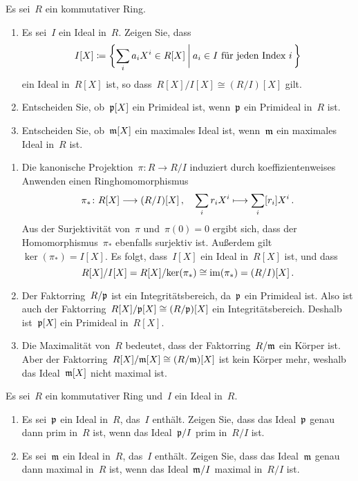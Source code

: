 \documentclass{scrartcl}
\begin{document}
\begin{exercise}
  Es sei~$R$ ein kommutativer Ring.
  \begin{enumerate}
    \item
      Es sei~$I$ ein Ideal in~$R$.
      Zeigen Sie, dass
      \[
        I[X]
        \defined
        \biggl\{
          \sum_i a_i X^i \in R[X]
        \suchthat[\bigg]
          \text{$a_i \in I$ für jeden Index~$i$}
          \spacing
        \biggr\}
      \]
      ein Ideal in~$R[X]$ ist, so dass~$R[X] / I[X] \cong (R/I)[X]$ gilt.
    \item
      Entscheiden Sie, ob~$\mathfrak{p}[X]$ ein Primideal ist, wenn~$\mathfrak{p}$ ein Primideal in~$R$ ist.
    \item
      Entscheiden Sie, ob~$\mathfrak{m}[X]$ ein maximales Ideal ist, wenn~$\mathfrak{m}$ ein maximales Ideal in~$R$ ist.
  \end{enumerate}
\end{exercise}

\begin{solution}
  \begin{enumerate}
    \item
      Die kanonische Projektion~$\pi \colon R \to R/I$ induziert durch koeffizientenweises Anwenden einen Ringhomomorphismus
      \[
        \pi_*
        \colon
        R[X]
        \to
        (R/I)[X] \,,
        \quad
        \sum_i r_i X^i
        \mapsto
        \sum_i \class{r_i} X^i \,.
      \]
      Aus der Surjektivität von~$\pi$ und~$\pi(0) = 0$ ergibt sich, dass der Homomorphismus~$\pi_*$ ebenfalls surjektiv ist.
      Außerdem gilt~$\ker(\pi_*) = I[X]$.
      Es folgt, dass~$I[X]$ ein Ideal in~$R[X]$ ist, und dass
      \[
        R[X] / I[X]
        =
        R[X] / {\ker(\pi_*)}
        \cong
        \operatorname{im}(\pi_*)
        =
        (R/I)[X] \,.
      \]
    \item
      Der Faktorring~$R / \mathfrak{p}$ ist ein Integritätsbereich, da~$\mathfrak{p}$ ein Primideal ist.
      Also ist auch der Faktorring~$R[X] / \mathfrak{p}[X] \cong (R/\mathfrak{p})[X]$ ein Integritätsbereich.
      Deshalb ist~$\mathfrak{p}[X]$ ein Primideal in~$R[X]$.
    \item
      Die Maximalität von~$R$ bedeutet, dass der Faktorring~$R / \mathfrak{m}$ ein Körper ist.
      Aber der Faktorring~$R[X] / \mathfrak{m}[X] \cong (R/\mathfrak{m})[X]$ ist kein Körper mehr, weshalb das Ideal~$\mathfrak{m}[X]$ nicht maximal ist.
  \end{enumerate}
\end{solution}

\begin{exercise}
  Es sei~$R$ ein kommutativer Ring und~$I$ ein Ideal in~$R$.
  \begin{enumerate}
    \item
      Es sei~$\mathfrak{p}$ ein Ideal in~$R$, das~$I$ enthält.
      Zeigen Sie, dass das Ideal~$\mathfrak{p}$ genau dann prim in~$R$ ist, wenn das Ideal~$\mathfrak{p}/I$ prim in~$R/I$ ist.
    \item
      Es sei~$\mathfrak{m}$ ein Ideal in~$R$, das~$I$ enthält.
      Zeigen Sie, dass das Ideal~$\mathfrak{m}$ genau dann maximal in~$R$ ist, wenn das Ideal~$\mathfrak{m}/I$ maximal in~$R/I$ ist.
  \end{enumerate}
\end{exercise}
\end{document}
